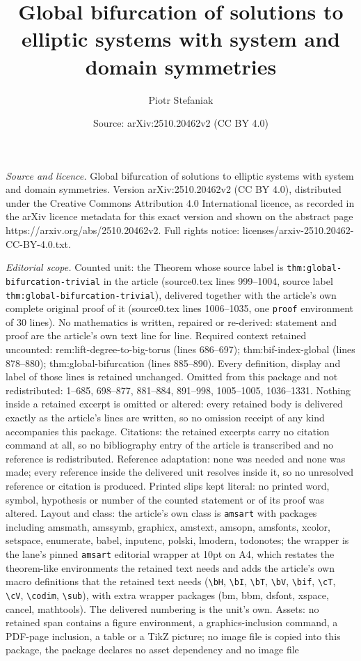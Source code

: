 \documentclass[10pt,a4paper]{amsart}
\title[Global bifurcation of solutions to elliptic systems with sys]{Global bifurcation of solutions to elliptic systems with system and domain symmetries}
\author{Piotr Stefaniak}
\date{Source: arXiv:2510.20462v2 (CC BY 4.0)}
\begin{document}
\maketitle

\noindent\emph{Source and licence.} Global bifurcation of solutions to elliptic systems with system and domain symmetries. Version arXiv:2510.20462v2 (CC BY 4.0), distributed under the Creative Commons Attribution 4.0 International licence, as recorded in the arXiv licence metadata for this exact version and shown on the abstract page https://arxiv.org/abs/2510.20462v2. Full rights notice: licenses/arxiv-2510.20462-CC-BY-4.0.txt.\par\smallskip

\noindent\textit{Editorial scope.} Counted unit: the Theorem whose source label is \texttt{thm:global-bifurcation-trivial} in the article (source0.tex lines 999--1004, source label \texttt{thm:global-bifurcation-trivial}), delivered together with the article's own complete original proof of it (source0.tex lines 1006--1035, one \texttt{proof} environment of 30 lines). No mathematics is written, repaired or re-derived: statement and proof are the article's own text line for line. Required context retained uncounted: rem:lift-degree-to-big-torus (lines 686--697); thm:bif-index-global (lines 878--880); thm:global-bifurcation (lines 885--890). Every definition, display and label of those lines is retained unchanged. Omitted from this package and not redistributed: 1--685, 698--877, 881--884, 891--998, 1005--1005, 1036--1331. Nothing inside a retained excerpt is omitted or altered: every retained body is delivered exactly as the article's lines are written, so no omission receipt of any kind accompanies this package. Citations: the retained excerpts carry no citation command at all, so no bibliography entry of the article is transcribed and no reference is redistributed. Reference adaptation: none was needed and none was made; every reference inside the delivered unit resolves inside it, so no unresolved reference or citation is produced. Printed slips kept literal: no printed word, symbol, hypothesis or number of the counted statement or of its proof was altered. Layout and class: the article's own class is \texttt{amsart} with packages including amsmath, amssymb, graphicx, amstext, amsopn, amsfonts, xcolor, setspace, enumerate, babel, inputenc, polski, lmodern, todonotes; the wrapper is the lane's pinned \texttt{amsart} editorial wrapper at 10pt on A4, which restates the theorem-like environments the retained text needs and adds the article's own macro definitions that the retained text needs (\texttt{\textbackslash bH}, \texttt{\textbackslash bI}, \texttt{\textbackslash bT}, \texttt{\textbackslash bV}, \texttt{\textbackslash bif}, \texttt{\textbackslash cT}, \texttt{\textbackslash cV}, \texttt{\textbackslash codim}, \texttt{\textbackslash sub}), with extra wrapper packages (bm, bbm, dsfont, xspace, cancel, mathtools). The delivered numbering is the unit's own. Assets: no retained span contains a figure environment, a graphics-inclusion command, a PDF-page inclusion, a table or a TikZ picture; no image file is copied into this package, the package declares no asset dependency and no image file 
\end{document}
